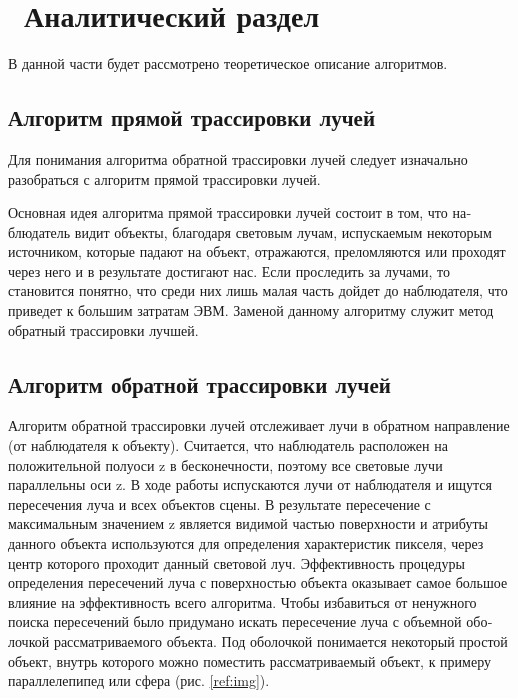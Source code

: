 \chapter{ Аналитический раздел}
\label{cha:analysis}




В данной части будет рассмотрено теоретическое описание алгоритмов.

\section{Алгоритм прямой трассировки лучей}

Для понимания алгоритма обратной трассировки лучей следует изначально разобраться с
алгоритм прямой трассировки лучей.

Основная идея алгоритма прямой трассировки лучей состоит в том, что на­блюдатель 
видит объекты, благодаря световым лучам, испускаемым некоторым ис­точником,
которые падают на объект, отражаются, преломляются или проходят че­рез
него и в результате достигают нас. Если проследить за лучами, то становится
понятно, что среди них лишь малая часть дойдет до наблюдателя, что приведет к
большим затратам ЭВМ. Заменой данному алгоритму служит метод обратный трас­сировки лучшей.

\section{Алгоритм обратной трассировки лучей}

Алгоритм обратной трассировки лучей отслеживает лучи в обратном направ­ление (от наблюдателя к объекту).
Считается, что наблюдатель расположен на положительной полуоси z в бес­конечности,
поэтому все световые лучи параллельны оси z. В ходе работы испуска­ются
лучи от наблюдателя и ищутся пересечения луча и всех объектов сцены.
В результате пересечение с максимальным значением z является видимой частью
поверхности и атрибуты данного объекта используются для определения характери­стик
пикселя, через центр которого проходит данный световой луч. Эффективность
процедуры определения пересечений луча с поверхностью объекта оказывает самое
большое влияние на эффективность всего алгоритма. Чтобы избавиться от ненуж­ного
поиска пересечений было придумано искать пересечение луча с объемной обо­лочкой
рассматриваемого объекта. Под оболочкой понимается некоторый простой
объект, внутрь которого можно поместить рассматриваемый объект, к примеру па­раллелепипед или сфера (рис. \ref{ref:img}).

